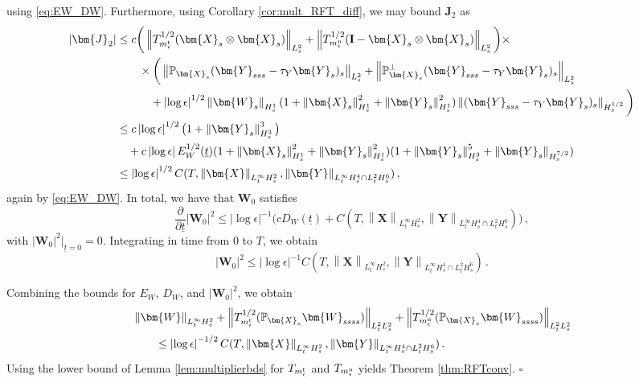 \documentclass[11pt,reqno]{amsart}
\renewcommand{\P}{\mathbb{P}}
\newcommand{\X}{\bm{X}}
\newcommand{\Y}{\bm{Y}}
\newcommand{\p}{\partial}
\newcommand{\abs}[1]{\left\lvert #1 \right\rvert}
\newcommand{\norm}[1]{\left\lVert #1 \right\rVert}
\numberwithin{equation}{section}
\theoremstyle{definition}
\begin{document}
using \eqref{eq:EW_DW}.
%
%
Furthermore, using Corollary \ref{cor:mult_RFT_diff}, we may bound $\bm{J}_2$ as
\begin{equation}
\begin{aligned}
  \abs{\bm{J}_2} &\le c\bigg(\norm{T_{m_\epsilon^{\rm t}}^{1/2}(\X_s\otimes\X_s)}_{L^2_s} +\norm{T_{m_\epsilon^{\rm n}}^{1/2}({\bf I}-\X_s\otimes\X_s)}_{L^2_s} \bigg)\times\\
  &\qquad\times \bigg(\norm{\P_{\X_s}(\Y_{sss} -\tau_Y\Y_s)_s}_{L^2_s} + \norm{\P_{\X_s}^\perp(\Y_{sss} -\tau_Y\Y_s)_s}_{L^2_s} \\
  &\qquad\quad +\abs{\log\epsilon}^{1/2}\norm{\bm{W}_s}_{H^1_s}(1+\norm{\X_s}_{H^1_s}^2+\norm{\Y_s}_{H^1_s}^2)\norm{(\Y_{sss} -\tau_Y\Y_s)_s}_{H^{1/2}_s}\bigg)\\
  &\le c\abs{\log\epsilon}^{1/2}\big(1+\norm{\Y_s}_{H^3_s}^3\big)\\
  &\quad +c\abs{\log\epsilon}E_W^{1/2}(\underline{t})(1+\norm{\X_s}_{H^1_s}^2+\norm{\Y_s}_{H^1_s}^2)(1+\norm{\Y_s}_{H^3_s}^5+\norm{\Y_s}_{H^{7/2}_s})\\
  &\le \abs{\log\epsilon}^{1/2}C(T,\norm{\X}_{L^\infty_tH^2_s},\norm{\Y}_{L^\infty_tH^4_s\cap L^2_tH^6_s})\,,
\end{aligned}
\end{equation}
again by \eqref{eq:EW_DW}.
%
In total, we have that $\bm{W}_0$ satisfies
\begin{equation}
  \frac{\p}{\p\underline{t}}\abs{\bm{W}_0}^2 \le \abs{\log\epsilon}^{-1}\big(cD_W(\underline{t})+C(T,\norm{\X}_{L^\infty_tH^2_s},\norm{\Y}_{L^\infty_tH^4_s\cap L^2_tH^6_s}) \big)\,, 
\end{equation}
with $\abs{\bm{W}_0}^2\big|_{\underline{t}=0}=0$. Integrating in time from 0 to $T$, we obtain 
\begin{equation}
  \abs{\bm{W}_0}^2 \le \abs{\log\epsilon}^{-1}C(T,\norm{\X}_{L^\infty_tH^2_s},\norm{\Y}_{L^\infty_tH^4_s\cap L^2_tH^6_s})\,.
\end{equation}


Combining the bounds for $E_W$, $D_W$, and $\abs{\bm{W}_0}^2$, we obtain
\begin{equation}
\begin{aligned}
  &\norm{\bm{W}}_{L^\infty_t H^2_s} + \norm{T_{m_\epsilon^{\rm t}}^{1/2}(\P_{\X_s}\bm{W}_{ssss})}_{L^2_tL^2_s} + \norm{T_{m_\epsilon^{\rm n}}^{1/2}(\P_{\X_s}\bm{W}_{ssss})}_{L^2_tL^2_s}\\
  &\qquad \le \abs{\log\epsilon}^{-1/2}C(T,\norm{\X}_{L^\infty_tH^2_s},\norm{\Y}_{L^\infty_tH^4_s\cap L^2_tH^6_s})\,.
\end{aligned}
\end{equation}
Using the lower bound of Lemma \ref{lem:multiplierbds} for $T_{m_\epsilon^{\rm t}}$ and $T_{m_\epsilon^{\rm n}}$ yields Theorem \ref{thm:RFTconv}.
\hfill $\square$
\end{document}
